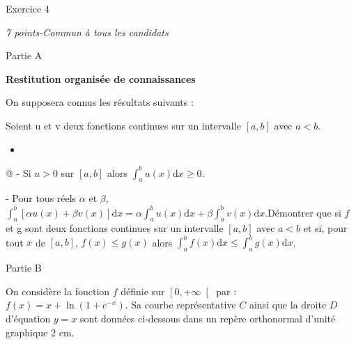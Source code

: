 
%
\begin{h2}Exercice 4\end{h2}
\textit{7 points-Commun à tous les candidats}
\begin{h3}Partie A\end{h3}
\textbf{Restitution organisée de connaissances}
\par
On supposera connus les résultats suivants :
\par
Soient u et v deux fonctions continues sur un intervalle $\left[a, b\right]$ avec $a < b$.

\begin{itemize}
\item

\end{itemize}@
- Si $u > 0$ sur $\left[a, b\right]$ alors $\int_{a}^{b} u\left(x\right)\text{d}x \geqslant 0$.
\par
- Pour tous réels $\alpha $ et $\beta $, $\int_{a}^{b} \left[\alpha  u\left(x\right)+\beta  v\left(x\right)\right] \text{d}x=\alpha   \int_{a}^{b} u\left(x\right) \text{d}x+\beta   \int_{a}^{b} v\left(x\right) \text{d}x.$Démontrer que si $f$ et g sont deux fonctions continues sur un intervalle $\left[a, b\right]$ avec $a < b$ et si, pour tout $x$ de $\left[a, b\right]$, $f\left(x\right) \leqslant g\left(x\right)$ alors $\int_{a}^{b} f\left(x\right) \text{d}x \leqslant  \int_{a}^{b} g\left(x\right) \text{d}x$.
\begin{h3}Partie B\end{h3}
On considère la fonction $f$ définie sur $\left[0, +\infty \right[$ par : $f\left(x\right)=x+\ln\left(1+e^{-x}\right)$. Sa courbe représentative $C$ ainsi que la droite $D$ d'équation $y=x$ sont données ci-dessous dans un repère orthonormal d'unité graphique 2 cm.

